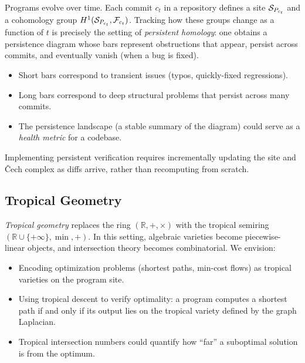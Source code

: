Programs evolve over time.  Each commit $c_t$ in a repository defines
a site $\mathcal{S}_{P_{c_t}}$ and a cohomology group
$H^{1}(\mathcal{S}_{P_{c_t}}, \mathcal{F}_{c_t})$.  Tracking how these
groups change as a function of $t$ is precisely the setting of
\emph{persistent homology}: one obtains a persistence diagram whose
bars represent obstructions that appear, persist across commits, and
eventually vanish (when a bug is fixed).

\begin{itemize}[leftmargin=1.5em]
  \item Short bars correspond to transient issues (typos, quickly-fixed
    regressions).
  \item Long bars correspond to deep structural problems that persist
    across many commits.
  \item The persistence landscape (a stable summary of the diagram)
    could serve as a \emph{health metric} for a codebase.
\end{itemize}

\noindent
Implementing persistent verification requires incrementally updating
the site and \v{C}ech complex as diffs arrive, rather than
recomputing from scratch.

\subsection{Tropical Geometry}\label{sec:future-tropical}

\emph{Tropical geometry} replaces the ring $(\mathbb{R}, +, \times)$
with the tropical semiring $(\mathbb{R} \cup \{+\infty\}, \min, +)$.
In this setting, algebraic varieties become piecewise-linear objects,
and intersection theory becomes combinatorial.  We envision:

\begin{itemize}[leftmargin=1.5em]
  \item Encoding optimization problems (shortest paths, min-cost flows)
    as tropical varieties on the program site.
  \item Using tropical descent to verify optimality: a program computes
    a shortest path if and only if its output lies on the tropical
    variety defined by the graph Laplacian.
  \item Tropical intersection numbers could quantify how ``far'' a
    suboptimal solution is from the optimum.
\end{itemize}

